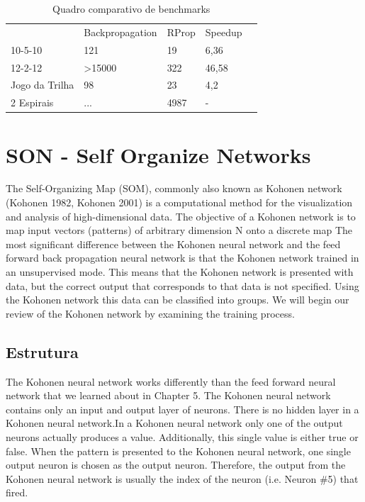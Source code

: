 \documentclass[
	article,			%
	11pt,				%
	oneside,			%
	a4paper,			%
	english,			%
	brazil,				%
	sumario=tradicional
	]{abntex2}
\begin{document}
\begin{table}[h]
\centering
\begin{tabular}{|l|l|l|l|l}
\cline{1-4}
               & Backpropagation   & RProp & Speedup &  \\ \cline{1-4}
10-5-10        & 121               & 19    &    6,36     &  \\ \cline{1-4}
12-2-12        & \textgreater15000 & 322   &   46,58      &  \\ \cline{1-4}
Jogo da Trilha & 98                & 23    &    4,2     &  \\ \cline{1-4}
2 Espirais     & ...               & 4987  &    -     &  \\ \cline{1-4}
\end{tabular}
\caption{Quadro comparativo de benchmarks}
\label{tab:bench}
\end{table}



\newpage

\section*{SON - Self Organize Networks} The Self-Organizing Map (SOM), commonly
also known as Kohonen network (Kohonen 1982, Kohonen 2001) is a computational
method for the visualization and analysis of high-dimensional data.
 The
objective of a Kohonen network is to map input vectors (patterns) of arbitrary
dimension N onto a discrete map The most significant difference between the
Kohonen neural network and the feed forward back propagation neural network is
that the Kohonen network trained in an unsupervised mode.
This means that the Kohonen network is presented with data, but the correct
output that corresponds to that data is not specified. Using the Kohonen network
this data can be classified into groups. We will begin our review of the Kohonen
network by examining the training process.
\subsection{Estrutura}
The Kohonen neural network works differently than the feed forward neural
network that we learned about in Chapter 5. The Kohonen neural network contains
only an input and output layer of neurons. There is no hidden layer in a Kohonen
neural network.In a Kohonen neural network only one of the output neurons
actually produces a value. Additionally, this single value is either true or
false. When the pattern is presented to the Kohonen neural network, one single
output neuron is chosen as the output neuron. Therefore, the output from the
Kohonen neural network is usually the index of the neuron (i.e. Neuron \#5) that
fired.
\end{document}
